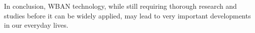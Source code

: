 \documentclass[conference]{IEEEtran}
\begin{document}
In conclusion, WBAN technology, while still requiring thorough research and studies before it can be widely applied, may lead to very important developments in our everyday lives. 

%
%
%
%
%
%
\end{document}
